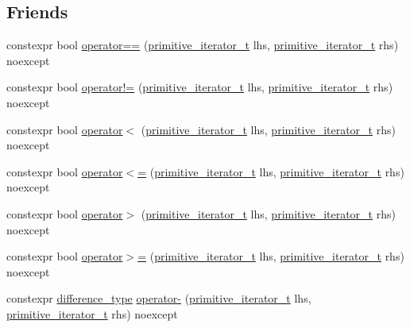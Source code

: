 \subsection*{Friends}
\begin{DoxyCompactItemize}
\item 
constexpr bool \hyperlink{classnlohmann_1_1detail_1_1primitive__iterator__t_aae1e1e2ec0e229d1291d69de57d76bbe}{operator==} (\hyperlink{classnlohmann_1_1detail_1_1primitive__iterator__t}{primitive\+\_\+iterator\+\_\+t} lhs, \hyperlink{classnlohmann_1_1detail_1_1primitive__iterator__t}{primitive\+\_\+iterator\+\_\+t} rhs) noexcept
\item 
constexpr bool \hyperlink{classnlohmann_1_1detail_1_1primitive__iterator__t_a1897889271e3fff10792d86baf1dbfdc}{operator!=} (\hyperlink{classnlohmann_1_1detail_1_1primitive__iterator__t}{primitive\+\_\+iterator\+\_\+t} lhs, \hyperlink{classnlohmann_1_1detail_1_1primitive__iterator__t}{primitive\+\_\+iterator\+\_\+t} rhs) noexcept
\item 
constexpr bool \hyperlink{classnlohmann_1_1detail_1_1primitive__iterator__t_a901a95e6d73c9509d3dcde914f6c8a9d}{operator$<$} (\hyperlink{classnlohmann_1_1detail_1_1primitive__iterator__t}{primitive\+\_\+iterator\+\_\+t} lhs, \hyperlink{classnlohmann_1_1detail_1_1primitive__iterator__t}{primitive\+\_\+iterator\+\_\+t} rhs) noexcept
\item 
constexpr bool \hyperlink{classnlohmann_1_1detail_1_1primitive__iterator__t_a7e620963ea069fd987d941c61ec4af0c}{operator$<$=} (\hyperlink{classnlohmann_1_1detail_1_1primitive__iterator__t}{primitive\+\_\+iterator\+\_\+t} lhs, \hyperlink{classnlohmann_1_1detail_1_1primitive__iterator__t}{primitive\+\_\+iterator\+\_\+t} rhs) noexcept
\item 
constexpr bool \hyperlink{classnlohmann_1_1detail_1_1primitive__iterator__t_a680c471188e46854d7b78a7c2a0c1122}{operator$>$} (\hyperlink{classnlohmann_1_1detail_1_1primitive__iterator__t}{primitive\+\_\+iterator\+\_\+t} lhs, \hyperlink{classnlohmann_1_1detail_1_1primitive__iterator__t}{primitive\+\_\+iterator\+\_\+t} rhs) noexcept
\item 
constexpr bool \hyperlink{classnlohmann_1_1detail_1_1primitive__iterator__t_aadc054c066f8d117695113ddceb8c46e}{operator$>$=} (\hyperlink{classnlohmann_1_1detail_1_1primitive__iterator__t}{primitive\+\_\+iterator\+\_\+t} lhs, \hyperlink{classnlohmann_1_1detail_1_1primitive__iterator__t}{primitive\+\_\+iterator\+\_\+t} rhs) noexcept
\item 
constexpr \hyperlink{classnlohmann_1_1detail_1_1primitive__iterator__t_af3db0d5c90de427d51645fe73a015553}{difference\+\_\+type} \hyperlink{classnlohmann_1_1detail_1_1primitive__iterator__t_ac6d902d6ec9a02dabed5452d3ae78f7e}{operator-\/} (\hyperlink{classnlohmann_1_1detail_1_1primitive__iterator__t}{primitive\+\_\+iterator\+\_\+t} lhs, \hyperlink{classnlohmann_1_1detail_1_1primitive__iterator__t}{primitive\+\_\+iterator\+\_\+t} rhs) noexcept

\end{DoxyCompactItemize}
